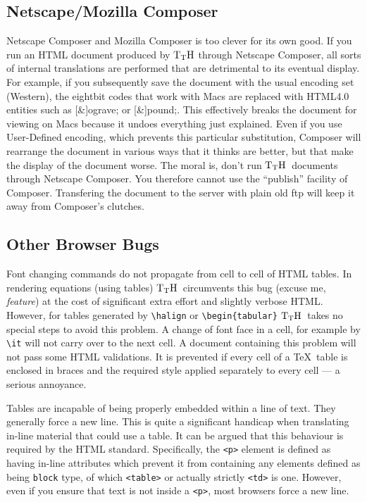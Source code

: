 \documentclass[12pt]{article}
\def\TtH{$\rm{}T_TH$}
\begin{document}
\subsection{Netscape/Mozilla Composer}
\label{nscomp}
Netscape Composer and Mozilla Composer is
too clever for its own good. If you run an HTML document produced by \TtH
through Netscape Composer, all sorts of internal translations are
performed that are detrimental to its eventual display. For example,
if you subsequently save the document with the usual encoding set
(Western), the eightbit codes that work with Macs are replaced with
HTML4.0 entities such as [\&]ograve; or [\&]pound;. This effectively
breaks the document for viewing on Macs because it undoes everything
just explained. Even if you use User-Defined encoding, which prevents
this particular substitution, Composer will rearrange the document in
various ways that it thinks are better, but that make the display of
the document worse. The moral is, don't run \TtH\ documents through
Netscape Composer.
  You therefore cannot use the ``publish'' facility
of Composer. Transfering the document to the server with plain old ftp
will keep it away from Composer's clutches.


\subsection{Other Browser Bugs}

\label{cellbug}

Font changing commands do not propagate from cell to cell of HTML
tables. In rendering equations (using tables) \TtH\ circumvents this
bug (excuse me, \emph{feature}) at the cost of significant extra effort and
slightly verbose HTML.  However, for tables generated by
\verb+\halign+ or \verb+\begin{tabular}+ \TtH\ takes no special steps
to avoid this problem. A change of font face in a cell, for example by
\verb+\it+ will not carry over to the next cell.  A document
containing this problem will not pass some HTML validations.  It is
prevented if every cell of a \TeX\ table is enclosed in braces and the
required style applied separately to every cell --- a serious
annoyance.

\label{tablebug}
Tables are incapable of being properly embedded within a line of text.
They generally force a new line. This is quite a significant handicap
when translating in-line material that could use a table. It can be
argued that this behaviour is required by the HTML
standard. Specifically, the \verb!<p>! element is defined as having
in-line attributes which prevent it from containing any elements
defined as being \verb!block! type, of which \verb!<table>! or
actually strictly \verb!<td>! is one. However, even if you ensure that
text is not inside a \verb!<p>!, most browsers force a new line.
\end{document}
